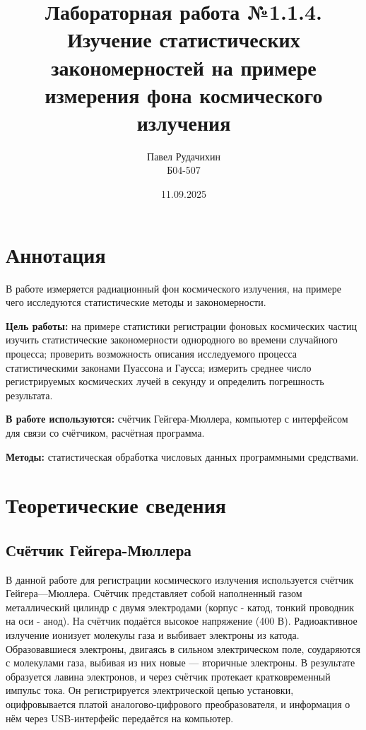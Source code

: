 \documentclass{report}
\title{Лабораторная работа №1.1.4. \\ Изучение статистических закономерностей на примере измерения фона космического излучения}
\author{Павел Рудачихин \\ Б04-507}
\date{11.09.2025}
\begin{document}
	\maketitle{}
	\section* {Аннотация} 
	
	\hspace{4mm} В работе измеряется радиационный фон космического излучения, на примере чего исследуются статистические методы и закономерности.
	
	\textbf{Цель работы:} на примере статистики регистрации фоновых космических частиц изучить статистические закономерности однородного во времени случайного процесса; проверить возможность описания исследуемого процесса статистическими законами Пуассона и Гаусса; измерить среднее число регистрируемых космических лучей в секунду и определить погрешность результата.

	\textbf{В работе используются:} счётчик Гейгера-Мюллера, компьютер с интерфейсом для связи со счётчиком, расчётная программа.
	
	\textbf{Методы:} статистическая обработка числовых данных программными средствами.
	
		
	\section* {Теоретические сведения}
	
	\subsection*{Счётчик Гейгера-Мюллера}
	
	
	\hspace{4mm} В данной работе для регистрации космического излучения используется счётчик Гейгера—Мюллера. Счётчик представляет собой наполненный газом металлический цилиндр с двумя электродами (корпус - катод, тонкий проводник на оси - анод). На счётчик подаётся высокое напряжение (400 В). Радиоактивное излучение ионизует молекулы газа и выбивает электроны из катода. Образовавшиеся электроны, двигаясь в сильном электрическом  поле,  соударяются  с  молекулами газа, выбивая из них новые — вторичные электроны. В результате образуется лавина электронов, и через счётчик протекает кратковременный импульс тока. Он регистрируется электрической цепью установки, оцифровывается платой аналогово-цифрового преобразователя, и информация о нём через USB-интерфейс передаётся на компьютер.
	
\end{document}
